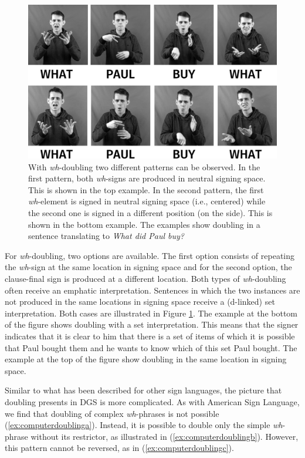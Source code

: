 \begin{figure}[bt]
\centering
	\includegraphics[width=1.0\textwidth]{whdoublingsw.jpg}
	\caption{With \textit{wh}-doubling two different patterns can be observed. In the first pattern, both \textit{wh}-signs are produced in neutral signing space. This is shown in the top example. In the second pattern, the first \textit{wh}-element is signed in neutral signing space (i.e., centered) while the second one is signed in a different position (on the side). This is shown in the bottom example. The examples show doubling in a sentence translating to \textit{What did Paul buy?}}
	\label{whdoubling}
\end{figure}

For \textit{wh}-doubling, two options are available. The first option consists of repeating the \textit{wh}-sign at the same location in signing space and for the second option, the clause-final sign is produced at a different location. Both types of \textit{wh}-doubling often receive an emphatic interpretation. Sentences in which the two instances are not produced in the same locations in signing space receive a (d-linked) set interpretation. Both cases are illustrated in Figure \ref{whdoubling}. The example at the bottom of the figure shows doubling with a set interpretation. This means that the signer indicates that it is clear to him that there is a set of items of which it is possible that Paul bought them and he wants to know which of this set Paul bought. The example at the top of the figure show doubling in the same location in signing space. 

Similar to what has been described for other sign languages, the picture that doubling presents in DGS is more complicated. As with American Sign Language, we find that doubling of complex \textit{wh}-phrases is not possible (\ref{ex:computerdoublinga}). Instead, it is possible to double only the simple \textit{wh}-phrase without its restrictor, as illustrated in (\ref{ex:computerdoublingb}). However, this pattern cannot be reversed, as in (\ref{ex:computerdoublingc}).

